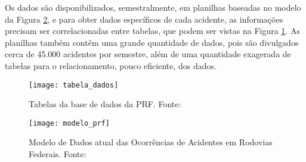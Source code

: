 
Os dados são disponibilizados, semestralmente, em planilhas baseadas no modelo da
Figura \ref{fig:modelo_prf}, e para obter dados específicos de cada acidente, as informações precisam ser
correlacionadas entre tabelas, que podem ser vistas na Figura \ref{fig:tabela_dados}. As planilhas também contêm
uma grande quantidade de dados, pois são divulgados cerca de 45.000 acidentes por semestre,
além de uma quantidade exagerada de tabelas para o relacionamento, pouco eficiente, dos
dados.

\begin{figure}[!htb]
 \centering
 \texttt{[image: tabela\_dados]}
 \caption[Tabelas da base de dados da PRF]{Tabelas da base de dados da PRF. Fonte: \cite{brasil13}}
 \label{fig:tabela_dados}
\end{figure}

\begin{figure}[!htb]
 \centering
 \texttt{[image: modelo\_prf]}
 \caption[Modelo de Dados atual das Ocorrências de Acidentes em Rodovias Federais]
  {Modelo de Dados atual das Ocorrências de Acidentes em Rodovias Federais. Fonte: \cite{brasil13}}
 \label{fig:modelo_prf}
\end{figure}

\vfill